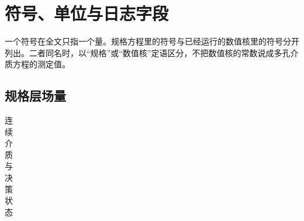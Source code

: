 \chapter{符号、单位与日志字段}
\label{app:symbols}

一个符号在全文只指一个量。规格方程里的符号与已经运行的数值核里的符号分开列出。二者同名时，以“规格”或“数值核”定语区分，不把数值核的常数说成多孔介质方程的测定值。

\section{规格层场量}

\begin{table}[htbp]
\centering
\caption{连续介质与决策状态}
\label{tab:app-sym}
{\footnotesize\setlength{\tabcolsep}{2pt}
\begin{tabular}{@{}l l p{3.7cm}@{}}


\end{tabular}}
\end{table}
